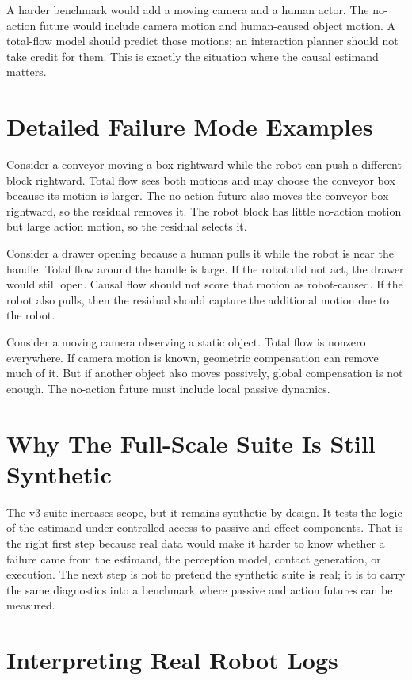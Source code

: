 \documentclass{article}
\begin{document}
A harder benchmark would add a moving camera and a human actor.  The no-action future
would include camera motion and human-caused object motion.  A total-flow model should
predict those motions; an interaction planner should not take credit for them.  This is
exactly the situation where the causal estimand matters.

\section{Detailed Failure Mode Examples}

Consider a conveyor moving a box rightward while the robot can push a different block
rightward.  Total flow sees both motions and may choose the conveyor box because its
motion is larger.  The no-action future also moves the conveyor box rightward, so the
residual removes it.  The robot block has little no-action motion but large action
motion, so the residual selects it.

Consider a drawer opening because a human pulls it while the robot is near the handle.
Total flow around the handle is large.  If the robot did not act, the drawer would still
open.  Causal flow should not score that motion as robot-caused.  If the robot also
pulls, then the residual should capture the additional motion due to the robot.

Consider a moving camera observing a static object.  Total flow is nonzero everywhere.
If camera motion is known, geometric compensation can remove much of it.  But if another
object also moves passively, global compensation is not enough.  The no-action future
must include local passive dynamics.

\section{Why The Full-Scale Suite Is Still Synthetic}

The v3 suite increases scope, but it remains synthetic by design.  It tests the logic of
the estimand under controlled access to passive and effect components.  That is the right
first step because real data would make it harder to know whether a failure came from the
estimand, the perception model, contact generation, or execution.  The next step is not
to pretend the synthetic suite is real; it is to carry the same diagnostics into a
benchmark where passive and action futures can be measured.

\section{Interpreting Real Robot Logs}
\end{document}
